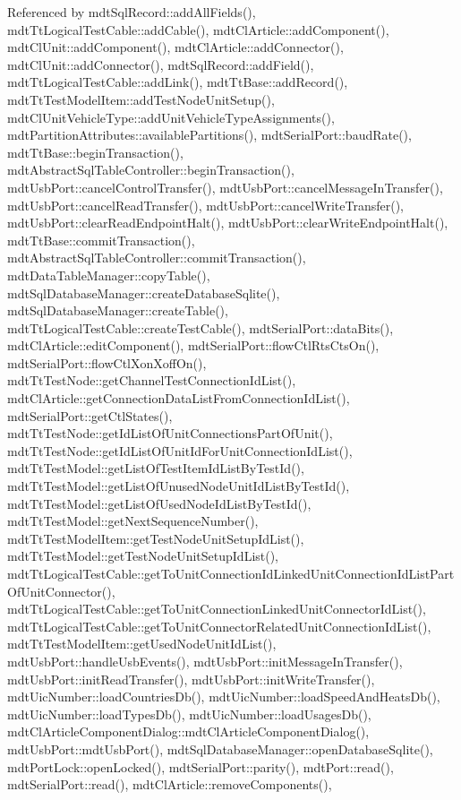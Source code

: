 Referenced by mdt\-Sql\-Record\-::add\-All\-Fields(), mdt\-Tt\-Logical\-Test\-Cable\-::add\-Cable(), mdt\-Cl\-Article\-::add\-Component(), mdt\-Cl\-Unit\-::add\-Component(), mdt\-Cl\-Article\-::add\-Connector(), mdt\-Cl\-Unit\-::add\-Connector(), mdt\-Sql\-Record\-::add\-Field(), mdt\-Tt\-Logical\-Test\-Cable\-::add\-Link(), mdt\-Tt\-Base\-::add\-Record(), mdt\-Tt\-Test\-Model\-Item\-::add\-Test\-Node\-Unit\-Setup(), mdt\-Cl\-Unit\-Vehicle\-Type\-::add\-Unit\-Vehicle\-Type\-Assignments(), mdt\-Partition\-Attributes\-::available\-Partitions(), mdt\-Serial\-Port\-::baud\-Rate(), mdt\-Tt\-Base\-::begin\-Transaction(), mdt\-Abstract\-Sql\-Table\-Controller\-::begin\-Transaction(), mdt\-Usb\-Port\-::cancel\-Control\-Transfer(), mdt\-Usb\-Port\-::cancel\-Message\-In\-Transfer(), mdt\-Usb\-Port\-::cancel\-Read\-Transfer(), mdt\-Usb\-Port\-::cancel\-Write\-Transfer(), mdt\-Usb\-Port\-::clear\-Read\-Endpoint\-Halt(), mdt\-Usb\-Port\-::clear\-Write\-Endpoint\-Halt(), mdt\-Tt\-Base\-::commit\-Transaction(), mdt\-Abstract\-Sql\-Table\-Controller\-::commit\-Transaction(), mdt\-Data\-Table\-Manager\-::copy\-Table(), mdt\-Sql\-Database\-Manager\-::create\-Database\-Sqlite(), mdt\-Sql\-Database\-Manager\-::create\-Table(), mdt\-Tt\-Logical\-Test\-Cable\-::create\-Test\-Cable(), mdt\-Serial\-Port\-::data\-Bits(), mdt\-Cl\-Article\-::edit\-Component(), mdt\-Serial\-Port\-::flow\-Ctl\-Rts\-Cts\-On(), mdt\-Serial\-Port\-::flow\-Ctl\-Xon\-Xoff\-On(), mdt\-Tt\-Test\-Node\-::get\-Channel\-Test\-Connection\-Id\-List(), mdt\-Cl\-Article\-::get\-Connection\-Data\-List\-From\-Connection\-Id\-List(), mdt\-Serial\-Port\-::get\-Ctl\-States(), mdt\-Tt\-Test\-Node\-::get\-Id\-List\-Of\-Unit\-Connections\-Part\-Of\-Unit(), mdt\-Tt\-Test\-Node\-::get\-Id\-List\-Of\-Unit\-Id\-For\-Unit\-Connection\-Id\-List(), mdt\-Tt\-Test\-Model\-::get\-List\-Of\-Test\-Item\-Id\-List\-By\-Test\-Id(), mdt\-Tt\-Test\-Model\-::get\-List\-Of\-Unused\-Node\-Unit\-Id\-List\-By\-Test\-Id(), mdt\-Tt\-Test\-Model\-::get\-List\-Of\-Used\-Node\-Id\-List\-By\-Test\-Id(), mdt\-Tt\-Test\-Model\-::get\-Next\-Sequence\-Number(), mdt\-Tt\-Test\-Model\-Item\-::get\-Test\-Node\-Unit\-Setup\-Id\-List(), mdt\-Tt\-Test\-Model\-::get\-Test\-Node\-Unit\-Setup\-Id\-List(), mdt\-Tt\-Logical\-Test\-Cable\-::get\-To\-Unit\-Connection\-Id\-Linked\-Unit\-Connection\-Id\-List\-Part\-Of\-Unit\-Connector(), mdt\-Tt\-Logical\-Test\-Cable\-::get\-To\-Unit\-Connection\-Linked\-Unit\-Connector\-Id\-List(), mdt\-Tt\-Logical\-Test\-Cable\-::get\-To\-Unit\-Connector\-Related\-Unit\-Connection\-Id\-List(), mdt\-Tt\-Test\-Model\-Item\-::get\-Used\-Node\-Unit\-Id\-List(), mdt\-Usb\-Port\-::handle\-Usb\-Events(), mdt\-Usb\-Port\-::init\-Message\-In\-Transfer(), mdt\-Usb\-Port\-::init\-Read\-Transfer(), mdt\-Usb\-Port\-::init\-Write\-Transfer(), mdt\-Uic\-Number\-::load\-Countries\-Db(), mdt\-Uic\-Number\-::load\-Speed\-And\-Heats\-Db(), mdt\-Uic\-Number\-::load\-Types\-Db(), mdt\-Uic\-Number\-::load\-Usages\-Db(), mdt\-Cl\-Article\-Component\-Dialog\-::mdt\-Cl\-Article\-Component\-Dialog(), mdt\-Usb\-Port\-::mdt\-Usb\-Port(), mdt\-Sql\-Database\-Manager\-::open\-Database\-Sqlite(), mdt\-Port\-Lock\-::open\-Locked(), mdt\-Serial\-Port\-::parity(), mdt\-Port\-::read(), mdt\-Serial\-Port\-::read(), mdt\-Cl\-Article\-::remove\-Components(), 